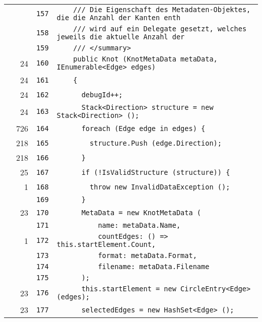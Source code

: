 \documentclass[a4paper,10pt]{article}
\begin{document}
\begin{longtable}[l]{lrrl}
\cellcolor{gray} &  & \verb~157~ & \verb~    /// Die Eigenschaft des Metadaten-Objektes, die die Anzahl der Kanten enth~\\
\cellcolor{gray} &  & \verb~158~ & \verb~    /// wird auf ein Delegate gesetzt, welches jeweils die aktuelle Anzahl der~\\
\cellcolor{gray} &  & \verb~159~ & \verb~    /// </summary>~\\
\cellcolor{green} & 24 & \verb~160~ & \verb~    public Knot (KnotMetaData metaData, IEnumerable<Edge> edges)~\\
\cellcolor{green} & 24 & \verb~161~ & \verb~    {~\\
\cellcolor{green} & 24 & \verb~162~ & \verb~      debugId++;~\\
\cellcolor{green} & 24 & \verb~163~ & \verb~      Stack<Direction> structure = new Stack<Direction> ();~\\
\cellcolor{green} & 726 & \verb~164~ & \verb~      foreach (Edge edge in edges) {~\\
\cellcolor{green} & 218 & \verb~165~ & \verb~        structure.Push (edge.Direction);~\\
\cellcolor{green} & 218 & \verb~166~ & \verb~      }~\\
\cellcolor{green} & 25 & \verb~167~ & \verb~      if (!IsValidStructure (structure)) {~\\
\cellcolor{green} & 1 & \verb~168~ & \verb~        throw new InvalidDataException ();~\\
\cellcolor{gray} &  & \verb~169~ & \verb~      }~\\
\cellcolor{green} & 23 & \verb~170~ & \verb~      MetaData = new KnotMetaData (~\\
\cellcolor{gray} &  & \verb~171~ & \verb~          name: metaData.Name,~\\
\cellcolor{green} & 1 & \verb~172~ & \verb~          countEdges: () => this.startElement.Count,~\\
\cellcolor{gray} &  & \verb~173~ & \verb~          format: metaData.Format,~\\
\cellcolor{gray} &  & \verb~174~ & \verb~          filename: metaData.Filename~\\
\cellcolor{gray} &  & \verb~175~ & \verb~      );~\\
\cellcolor{green} & 23 & \verb~176~ & \verb~      this.startElement = new CircleEntry<Edge> (edges);~\\
\cellcolor{green} & 23 & \verb~177~ & \verb~      selectedEdges = new HashSet<Edge> ();~\\

\end{longtable}
\end{document}
